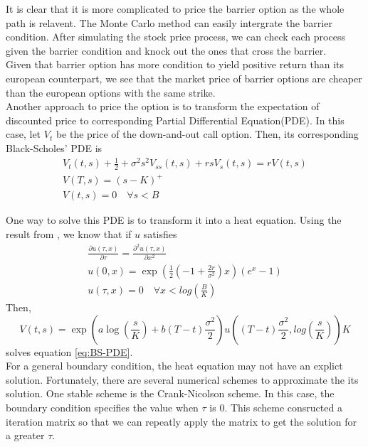 \documentclass[a4paper, draft, 11pt]{article}
\begin{document}
It is clear that it is more complicated to price the barrier option as the whole path is relavent. The Monte Carlo method can easily intergrate the barrier condition. After simulating the stock price process, we can check each process given the barrier condition and knock out the ones that cross the barrier.\\

Given that barrier option has more condition to yield positive return than its european counterpart, we see that the market price of barrier options are cheaper than the european options with the same strike.\\

Another approach to price the option is to transform the expectation of discounted price to corresponding Partial Differential Equation(PDE). In this case, let $V_t$ be the price of the down-and-out call option. Then, its corresponding Black-Scholes' PDE \cite[p. 79]{note417} is
\begin{gather}
	V_t(t,s) + \frac{1}{2} + \sigma^2 s^2 V_{ss}(t,s) + rsV_s(t,s) = rV(t,s)\nonumber\\
	V(T,s) = (s-K)^+\\
	V(t,s) = 0 \quad \forall s < B\nonumber
	\label{eq:BS-PDE}
\end{gather}

One way to solve this PDE is to transform it into a heat equation. Using the result from %
, we know that if $u$ satisfies
\begin{gather}
	\frac{\partial u(\tau,x)}{\partial \tau} = \frac{\partial^2 u(\tau,x)}{\partial x^2}\nonumber\\
	u(0,x) = \exp(\frac{1}{2}(-1+\frac{2r}{\sigma^2})x)(e^x-1)\\
	u(\tau, x) = 0 \quad \forall x < log(\frac{B}{K})\nonumber
\label{eq:heat_equation}
\end{gather}
Then, 
\begin{equation}
	V(t,s) = \exp(a\log(\frac{s}{K})+b(T-t)\frac{\sigma^2}{2})u\left((T-t )\frac{\sigma^2}{2}, log(\frac{s}{K}) \right)K
	\label{eq:BS-PDE_solution}
\end{equation}
solves equation \ref{eq:BS-PDE}.\\

For a general boundary condition, the heat equation may not have an explict solution. Fortunately, there are several numerical schemes to approximate the its solution. One stable scheme is the Crank-Nicolson scheme\cite[p.88]{note417}. In this case, the boundary condition specifies the value when $\tau$ is 0. This scheme consructed a iteration matrix so that we can repeatly apply the matrix to get the solution for a greater $\tau$. \\
\end{document}
